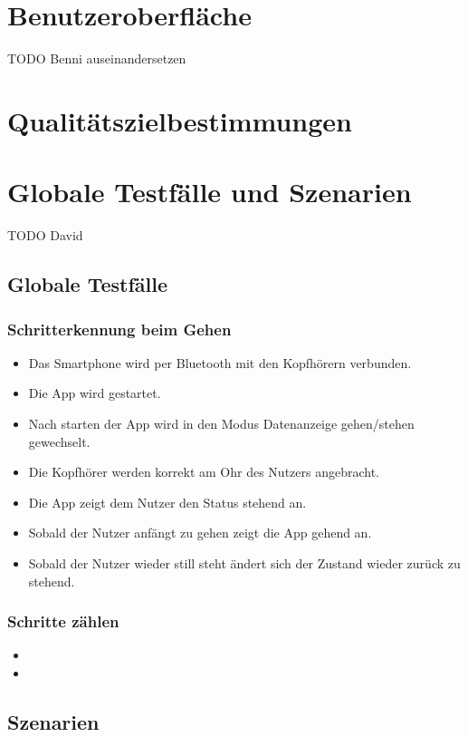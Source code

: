 \documentclass[a4paper,12pt]{article}
\begin{document}
\section{Benutzeroberfläche}
TODO Benni auseinandersetzen
\section{Qualitätszielbestimmungen} %
\section{Globale Testfälle und Szenarien}
TODO David
  \subsection{Globale Testfälle}
  \subsubsection{Schritterkennung beim Gehen}
  \begin{itemize}
    \item[]Das Smartphone wird per Bluetooth mit den Kopfhörern verbunden.
    \item[]Die App wird gestartet.
    \item[]Nach starten der App wird in den Modus \glqq Datenanzeige gehen/stehen\grqq{} gewechselt.
    \item[]Die Kopfhörer werden korrekt am Ohr des Nutzers angebracht.
    \item[]Die App zeigt dem Nutzer den Status \glqq stehend\grqq{} an.
    \item[]Sobald der Nutzer anfängt zu gehen zeigt die App \glqq gehend\grqq{} an.
    \item[]Sobald der Nutzer wieder still steht ändert sich der Zustand wieder zurück zu \glqq stehend\grqq. 
  \end{itemize}
  \subsubsection{Schritte zählen}
  \begin{itemize}
    \item[]
    \item[] 
  \end{itemize}
  \subsection{Szenarien}
\end{document}
